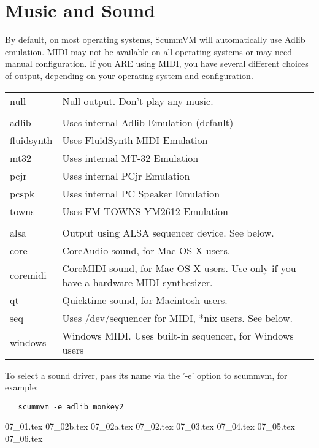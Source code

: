 

\section{Music and Sound} \label{sect-music-and-sound}
By default, on most operating systems, ScummVM will automatically use Adlib
emulation. MIDI may not be available on all operating systems or may need
manual configuration. If you ARE using MIDI, you have several different
choices of output, depending on your operating system and configuration.

\begin{tabular}[h]{ll}
  null       & Null output. Don't play any music.\\
             & \\
  adlib      & Uses internal Adlib Emulation (default)\\
  fluidsynth & Uses FluidSynth MIDI Emulation\\
  mt32       & Uses internal MT-32 Emulation\\
  pcjr       & Uses internal PCjr Emulation \\
  pcspk      & Uses internal PC Speaker Emulation\\
  towns      & Uses FM-TOWNS YM2612 Emulation\\
             & \\
  alsa       & Output using ALSA sequencer device. See below.\\
  core       & CoreAudio sound, for Mac OS X users.\\
  coremidi   & CoreMIDI sound, for Mac OS X users. Use only if you have a hardware MIDI synthesizer.\\
  qt         & Quicktime sound, for Macintosh users.\\
  seq        & Uses /dev/sequencer for MIDI, *nix users. See below.\\
  windows    & Windows MIDI. Uses built-in sequencer, for Windows users\\
\end{tabular}

To select a sound driver, pass its name via the '-e' option to scummvm,
for example:
\begin{verbatim}
   scummvm -e adlib monkey2
\end{verbatim}

 {07_01.tex}
 {07_02b.tex}
 {07_02a.tex}
 {07_02.tex}
 {07_03.tex}
 {07_04.tex}
 {07_05.tex}
 {07_06.tex}

